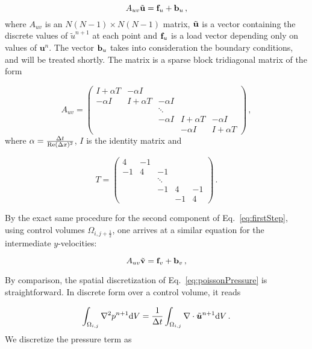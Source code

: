 \documentclass[final,3p,twocolumn]{elsarticle}
\begin{document}
\begin{equation}
    A_{uv} \tilde{\bf u} = {\bf f}_u + {\bf b}_u \,,
    \label{eq:xVelocityMatrix}
\end{equation}
%
where $A_{uv}$ is an $N(N-1) \times N(N-1)$ matrix, $\tilde{\bf u}$ is a
vector containing the discrete values of $\tilde{u}^{n+1}$ at each point and ${\bf f}_u$ is a
load vector depending only on values of $\bm{u}^n$. The
vector ${\bf b}_u$ takes into consideration the boundary conditions, and
will be treated shortly. The matrix is a sparse block tridiagonal matrix of the
form

\begin{equation*}
    A_{uv} = 
    \begin{pmatrix}
        I + \alpha T & -\alpha I \\
        -\alpha I & I + \alpha T & -\alpha I \\
        & & \ddots \\
        & & -\alpha I & I + \alpha T & -\alpha I \\
        & & & -\alpha I & I + \alpha T
    \end{pmatrix} \,,
\end{equation*}
%
where $\alpha = \frac{\Delta t}{{\rm Re}(\Delta x)^2}$, $I$ is the identity
matrix and

\begin{equation*}
    T = 
    \begin{pmatrix}
        4 & -1 \\
        -1 & 4 & -1 \\
        & & \ddots \\ 
        & & -1 & 4 & -1 \\
        & & & -1 & 4
    \end{pmatrix} \,.
\end{equation*}

By the exact same procedure for the second component of Eq.\
\eqref{eq:firstStep}, using control volumes $\Omega_{i,j+\frac{1}{2}}$, one
arrives at a similar equation for the intermediate $y$-velocities: 

\begin{equation}
    A_{uv} \tilde{\bf v} = {\bf f}_v + {\bf b}_v \,,
    \label{eq:yVelocityMatrix}
\end{equation}

By comparison, the spatial discretization of Eq.\ \eqref{eq:poissonPressure} is
straightforward. In discrete form over a control volume, it reads 

\begin{equation}
    \int_{\Omega_{i,j}} \nabla^2 p^{n+1} {\rm d}V = \frac{1}{\Delta t}
    \int_{\Omega_{i,j}} \nabla \cdot \tilde{\bm{u}}^{n+1} {\rm d}V \,.
\end{equation}
%
We discretize the pressure term as 
\end{document}
